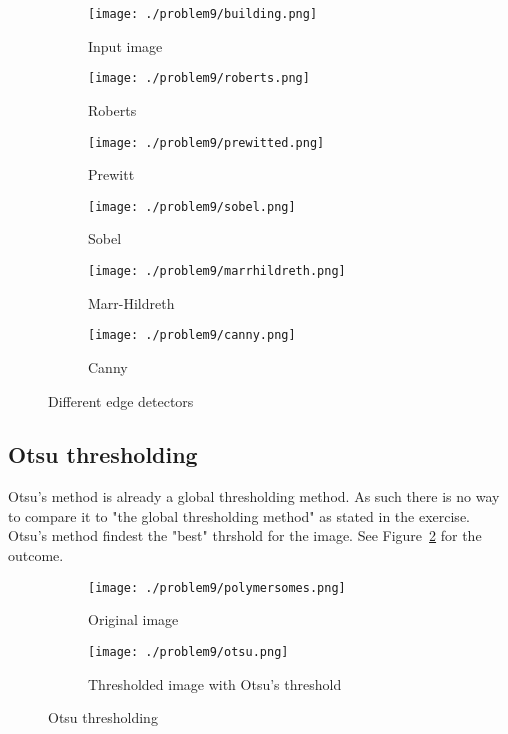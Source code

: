 \documentclass[a4paper]{scrartcl}
\begin{document}
\begin{figure}[H]
  \centering
  \begin{subfigure}[t]{0.3\textwidth}
    \texttt{[image: ./problem9/building.png]}
    \caption{Input image}
  \end{subfigure}
  \begin{subfigure}[t]{0.3\textwidth}
    \texttt{[image: ./problem9/roberts.png]}
    \caption{Roberts}
  \end{subfigure}
  \begin{subfigure}[t]{0.3\textwidth}
    \texttt{[image: ./problem9/prewitted.png]}
    \caption{Prewitt}
  \end{subfigure}
  \begin{subfigure}[t]{0.3\textwidth}
    \texttt{[image: ./problem9/sobel.png]}
    \caption{Sobel}
  \end{subfigure}
  \begin{subfigure}[t]{0.3\textwidth}
    \texttt{[image: ./problem9/marrhildreth.png]}
    \caption{Marr-Hildreth}
  \end{subfigure}
  \begin{subfigure}[t]{0.3\textwidth}
    \texttt{[image: ./problem9/canny.png]}
    \caption{Canny}
  \end{subfigure}
  \caption{Different edge detectors}
  \label{fig:edgedetectors}
\end{figure}

\subsection{Otsu thresholding}
\label{sub:otsu_thresholding}

Otsu's method is already a global thresholding method. As such there is no way to compare it to "the global thresholding method" as stated in the exercise. Otsu's method findest the "best" thrshold for the image. See Figure~\ref{fig:otsu} for the outcome.


\begin{figure}[H]
  \centering
  \begin{subfigure}[t]{0.4\textwidth}
    \texttt{[image: ./problem9/polymersomes.png]}
    \caption{Original image}
  \end{subfigure}
  \begin{subfigure}[t]{0.4\textwidth}
    \texttt{[image: ./problem9/otsu.png]}
    \caption{Thresholded image with Otsu's threshold}
  \end{subfigure}
  \caption{Otsu thresholding}
  \label{fig:otsu}
\end{figure}
\end{document}
